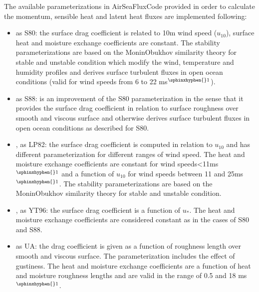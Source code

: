 \documentclass[letterpaper,10pt,english]{sphinxmanual}
\begin{document}
\sphinxAtStartPar
The available parameterizations in AirSeaFluxCode provided in order to calculate the momentum, sensible heat and latent heat fluxes are implemented following:
\begin{itemize}
\item {}
\sphinxAtStartPar
{} as S80: the surface drag coefficient is related to 10m wind speed (\(u_{10}\)), surface heat and moisture exchange coefficients are constant. The stability parameterizations are based on the Monin\sphinxhyphen{}Obukhov similarity theory for stable and unstable condition which modify the wind, temperature and humidity profiles and derives surface turbulent fluxes in open ocean conditions (valid for wind speeds from 6 to 22 ms$^{\text{\sphinxhyphen{}1}}$).

\item {}
\sphinxAtStartPar
{} as S88: is an improvement of the S80 parameterization in the sense that it provides the surface drag coefficient in relation to surface roughness over smooth and viscous surface and otherwise derives surface turbulent fluxes in open ocean conditions as described for S80.

\item {}
\sphinxAtStartPar
{},  as LP82: the surface drag coefficient is computed in relation to \(u_{10}\) and has different parameterization for different ranges of wind speed. The heat and moisture exchange coefficients are constant for wind speeds\textless{}11ms$^{\text{\sphinxhyphen{}1}}$ and a function of \(u_{10}\) for wind speeds between 11 and 25ms$^{\text{\sphinxhyphen{}1}}$. The stability parameterizations are based on the Monin\sphinxhyphen{}Obukhov similarity theory for stable and unstable condition.

\item {}
\sphinxAtStartPar
{},  as YT96: the surface drag coefficient is a function of \(u_{*}\). The heat and moisture exchange coefficients are considered constant as in the cases of S80 and S88.

\item {}
\sphinxAtStartPar
{} as UA: the drag coefficient is given as a function of roughness length over smooth and viscous surface. The parameterization includes the effect of gustiness. The heat and moisture exchange coefficients are a function of heat and moisture roughness lengths and are valid in the range of 0.5 and 18 ms$^{\text{\sphinxhyphen{}1}}$.


\end{itemize}
\end{document}
